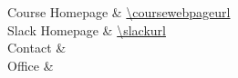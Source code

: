Course Homepage 							& \url{\coursewebpageurl} \\
Slack	 Homepage 							& \url{\slackurl} \\
Contact 										& \professorcontactinfo  \\
Office 										& \professoroffice  \\